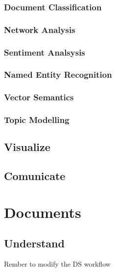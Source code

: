 \documentclass[]{book}
\theoremstyle{definition}
\theoremstyle{definition}
\theoremstyle{definition}
\theoremstyle{remark}
\begin{document}
\subsubsection{Document Classification}\label{sotatoolsmodeldocclass}

\subsubsection{Network Analysis}\label{sotatoolsmodelnetanal}

\subsubsection{Sentiment Analsysis}\label{sotatoolsmodelsentanal}

\subsubsection{Named Entity Recognition}\label{sotatoolsmodelner}

\subsubsection{Vector Semantics}\label{sotatoolsmodelvec}

\subsubsection{Topic Modelling}\label{sotatoolsmodeltopicmodel}

\subsection{Visualize}\label{sotatoolsvisualize}

\subsection{Comunicate}\label{sotatoolscomunicate}

\section{Documents}\label{sotadocuments}

\subsection{Understand}\label{sotadocumentsunderstand}

Rember to modify the DS workflow
\end{document}

